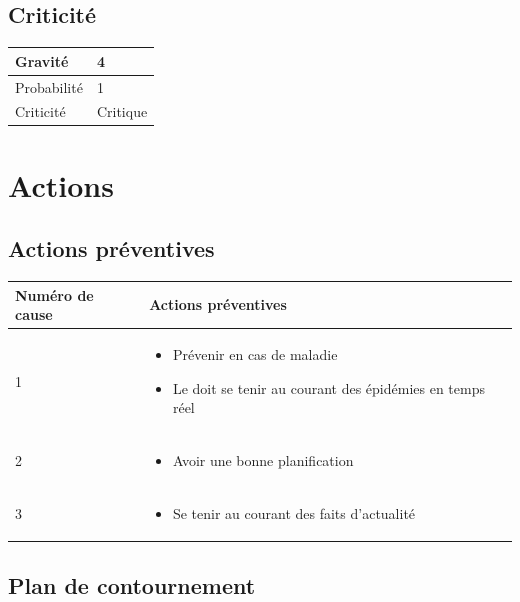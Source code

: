 \subsection*{Criticité}

\begin{table}[h]
\centering
	\begin{tabularx}{12.8cm}{|>{}X|X|}
	\hline
	Gravité & 4\\
	\hline
	Probabilité & 1\\
	\hline
	Criticité & Critique\\
	\hline
	\end{tabularx}
\end{table}
\newpage

\section*{Actions}
\subsection*{Actions préventives}

\centering
	\begin{longtable}{|p{7cm}|p{7cm}|}
	\hline
	\rowcolor{gray!40} Numéro de cause & Actions préventives \\
	\hline
	 1 & \begin{itemize}
	 	\item Prévenir en cas de maladie
	 	\item Le \CP doit se tenir au courant des épidémies en temps réel
	 \end{itemize} \\

	\hline
	2 & \begin{itemize}
		\item Avoir une bonne planification
	\end{itemize} \\
	\hline
	3 & \begin{itemize}
		\item Se tenir au courant des faits d'actualité
	\end{itemize} \\
	\hline
	\end{longtable}

\flushleft
\subsection*{Plan de contournement}

